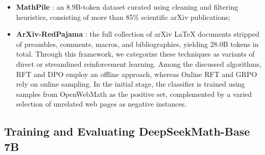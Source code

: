 \begin{itemize}[topsep=0pt]
\begin{itemize}[topsep=0pt]
\begin{itemize}[topsep=0pt]
\begin{itemize}[topsep=0pt]
    \item \textbf{MathPile} \citep{mathpile}: an 8.9B-token dataset curated using cleaning and filtering heuristics, consisting of more than 85\% scientific arXiv publications;
    \item \textbf{ArXiv-RedPajama} \citep{redpajama}: the full collection of arXiv LaTeX documents stripped of preambles, comments, macros, and bibliographies, yielding 28.0B tokens in total. Through this framework, we categorize these techniques as variants of direct or streamlined reinforcement learning. Among the discussed algorithms, RFT and DPO employ an offline approach, whereas Online RFT and GRPO rely on online sampling. In the initial stage, the classifier is trained using samples from OpenWebMath \citep{openwebmath} as the positive set, complemented by a varied selection of unrelated web pages as negative instances. \end{itemize}

\subsection{Training and Evaluating DeepSeekMath-Base 7B}


\end{itemize}
\end{itemize}
\end{itemize}

